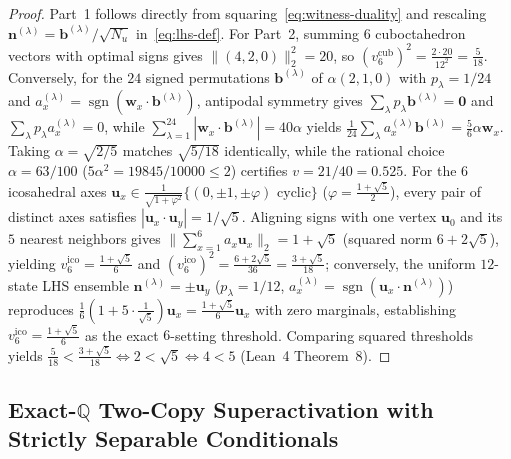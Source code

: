 \documentclass[11pt,a4paper]{article}
\theoremstyle{definition}
\theoremstyle{remark}
\newcommand{\QQ}{\mathbb{Q}}
\newcommand{\sgn}{\operatorname{sgn}}
\begin{document}
\begin{proof}
Part~1 follows directly from squaring~\eqref{eq:witness-duality} and rescaling $\mathbf{n}^{(\lambda)} = \mathbf{b}^{(\lambda)}/\sqrt{N_u}$ in~\eqref{eq:lhs-def}. For Part~2, summing $6$ cuboctahedron vectors with optimal signs gives $\|(4,2,0)\|_2^2 = 20$, so $(v_6^{\mathrm{cub}})^2 = \frac{2 \cdot 20}{12^2} = \frac{5}{18}$. Conversely, for the $24$ signed permutations $\mathbf{b}^{(\lambda)}$ of $\alpha(2,1,0)$ with $p_\lambda = 1/24$ and $a_x^{(\lambda)} = \sgn(\mathbf{w}_x\cdot\mathbf{b}^{(\lambda)})$, antipodal symmetry gives $\sum_\lambda p_\lambda \mathbf{b}^{(\lambda)} = \mathbf{0}$ and $\sum_\lambda p_\lambda a_x^{(\lambda)} = 0$, while $\sum_{\lambda=1}^{24}|\mathbf{w}_x\cdot\mathbf{b}^{(\lambda)}| = 40\alpha$ yields $\frac{1}{24}\sum_\lambda a_x^{(\lambda)}\mathbf{b}^{(\lambda)} = \frac{5}{6}\alpha\mathbf{w}_x$. Taking $\alpha = \sqrt{2/5}$ matches $\sqrt{5/18}$ identically, while the rational choice $\alpha = 63/100$ ($5\alpha^2 = 19845/10000 \le 2$) certifies $v = 21/40 = 0.525$. For the $6$ icosahedral axes $\mathbf{u}_x \in \frac{1}{\sqrt{1+\varphi^2}}\{(0,\pm 1,\pm\varphi)\text{ cyclic}\}$ ($\varphi = \frac{1+\sqrt{5}}{2}$), every pair of distinct axes satisfies $|\mathbf{u}_x\cdot\mathbf{u}_y| = 1/\sqrt{5}$. Aligning signs with one vertex $\mathbf{u}_0$ and its $5$ nearest neighbors gives $\|\sum_{x=1}^6 a_x \mathbf{u}_x\|_2 = 1 + \sqrt{5}$ (squared norm $6 + 2\sqrt{5}$), yielding $v_6^{\mathrm{ico}} = \frac{1+\sqrt{5}}{6}$ and $(v_6^{\mathrm{ico}})^2 = \frac{6+2\sqrt{5}}{36} = \frac{3+\sqrt{5}}{18}$; conversely, the uniform $12$-state LHS ensemble $\mathbf{n}^{(\lambda)} = \pm\mathbf{u}_y$ ($p_\lambda = 1/12$, $a_x^{(\lambda)} = \sgn(\mathbf{u}_x\cdot\mathbf{n}^{(\lambda)})$) reproduces $\frac{1}{6}(1 + 5\cdot\frac{1}{\sqrt{5}})\mathbf{u}_x = \frac{1+\sqrt{5}}{6}\mathbf{u}_x$ with zero marginals, establishing $v_6^{\mathrm{ico}} = \frac{1+\sqrt{5}}{6}$ as the exact $6$-setting threshold. Comparing squared thresholds yields $\frac{5}{18} < \frac{3+\sqrt{5}}{18} \iff 2 < \sqrt{5} \iff 4 < 5$ (Lean~4 Theorem~8).
\end{proof}

\subsection{Exact-\texorpdfstring{$\QQ$}{Q} Two-Copy Superactivation with Strictly Separable Conditionals}
\end{document}
